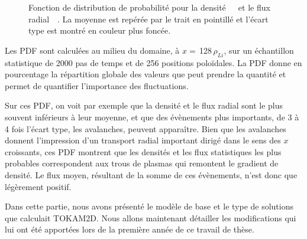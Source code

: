\begin{refsection}
\begin{figure}[!htbp]
    \centering
    \caption{Fonction de distribution de probabilité pour la
    densité~~~et le flux
    radial~~. La moyenne est repérée par le trait en
    pointillé et l'écart type est montré en couleur plus foncée.}
    \label{2-PDFBase}
\end{figure}

Les PDF
sont calculées au milieu du domaine, à $x=\,$128$\,\rho_{Li}$, sur un
échantillon statistique de 2000 pas de temps et de 256 positions
poloïdales. La PDF donne en pourcentage la répartition globale des valeurs
que peut prendre la quantité et permet de quantifier l'importance des fluctuations.

Sur ces PDF, on voit par exemple que la densité et le flux radial sont le plus
souvent inférieurs à leur moyenne, et que des évènements plus
importants, de 3 à 4 fois l'écart type, les avalanches, peuvent apparaître. Bien
que les avalanches donnent l'impression d'un transport radial
important dirigé dans le sens des $x$ croissants, ces PDF
montrent que les densités et les flux statistiques les plus probables 
correspondent aux trous de plasmas qui remontent le gradient de densité. Le flux
moyen, résultant de la somme de ces évènements, n'est donc que légèrement
positif.

Dans cette partie, nous avons présenté le modèle de base et le type
de solutions que calculait TOKAM2D. Nous allons maintenant détailler les
modifications qui lui ont été apportées lors de la première année de ce travail
de thèse.


\end{refsection}
